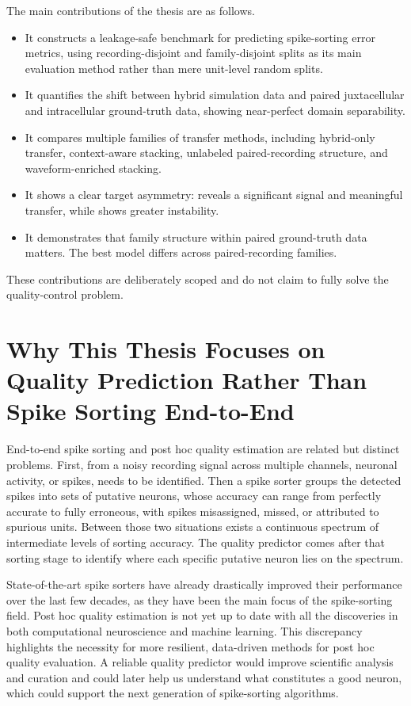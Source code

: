 The main contributions of the thesis are as follows.

\begin{itemize}
    \item It constructs a leakage-safe benchmark for predicting spike-sorting error metrics, using recording-disjoint and family-disjoint splits as its main evaluation method rather than mere unit-level random splits.
    \item It quantifies the shift between hybrid simulation data and paired juxtacellular and intracellular ground-truth data, showing near-perfect domain separability.
    \item It compares multiple families of transfer methods, including hybrid-only transfer, context-aware stacking, unlabeled paired-recording structure, and waveform-enriched stacking.
    \item It shows a clear target asymmetry: \fpos{} reveals a significant signal and meaningful transfer, while \fmiss{} shows greater instability.
    \item It demonstrates that family structure within paired ground-truth data matters. The best \fpos{} model differs across paired-recording families.
\end{itemize}

These contributions are deliberately scoped and do not claim to fully solve the quality-control problem.

\section{Why This Thesis Focuses on Quality Prediction Rather Than Spike Sorting End-to-End}

End-to-end spike sorting and post hoc quality estimation are related but distinct problems. First, from a noisy recording signal across multiple channels, neuronal activity, or spikes, needs to be identified. Then a spike sorter groups the detected spikes into sets of putative neurons, whose accuracy can range from perfectly accurate to fully erroneous, with spikes misassigned, missed, or attributed to spurious units. Between those two situations exists a continuous spectrum of intermediate levels of sorting accuracy. The quality predictor comes after that sorting stage to identify where each specific putative neuron lies on the spectrum.

State-of-the-art spike sorters have already drastically improved their performance over the last few decades, as they have been the main focus of the spike-sorting field. Post hoc quality estimation is not yet up to date with all the discoveries in both computational neuroscience and machine learning. This discrepancy highlights the necessity for more resilient, data-driven methods for post hoc quality evaluation. A reliable quality predictor would improve scientific analysis and curation and could later help us understand what constitutes a good neuron, which could support the next generation of spike-sorting algorithms.

